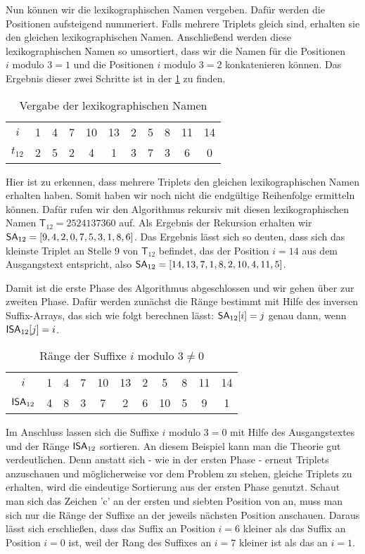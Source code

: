 Nun können wir die lexikographischen Namen vergeben. Dafür werden die Positionen aufsteigend nummeriert. Falls mehrere Triplets gleich sind, erhalten sie den gleichen lexikographischen Namen. Anschließend werden diese lexikographischen Namen so umsortiert, dass wir die Namen für die Positionen $i \text{ modulo } 3 = 1$ und die Positionen $i \text{ modulo } 3 = 2$ konkatenieren können. Das Ergebnis dieser zwei Schritte ist in der \cref{tab:lexNamen} zu finden.

\begin{table}[H]
	\centering
	\begin{tabular}{c| c c c c c c c c c c}
		$i$ & 1 & 4 & 7 & 10 & 13 & 2 & 5 & 8 & 11 & 14\\
		$t_{12}$ & 2 & 5 & 2 & 4 & 1 & 3 & 7 & 3 & 6 & 0
	\end{tabular}
	\caption{Vergabe der lexikographischen Namen}
	\label{tab:lexNamen}
\end{table}

Hier ist zu erkennen, dass mehrere Triplets den gleichen lexikographischen Namen erhalten haben. Somit haben wir noch nicht die endgültige Reihenfolge ermitteln können. Dafür rufen wir den Algorithmus rekursiv mit diesen lexikographischen Namen $\mathsf{T}_{12} = 2524137360$ auf. Als Ergebnis der Rekursion erhalten wir $\sa_{12} = [9, 4, 2, 0, 7, 5, 3, 1, 8, 6]$. Das Ergebnis lässt sich so deuten, dass sich das kleinste Triplet an Stelle 9 von $\mathsf{T}_{12}$ befindet, das der Position $i = 14$ aus dem Ausgangstext  entspricht, also $\sa_{12} = [14, 13, 7, 1, 8, 2, 10, 4, 11, 5]$. 

Damit ist die erste Phase des Algorithmus abgeschlossen und wir gehen über zur zweiten Phase. Dafür werden zunächst die Ränge bestimmt mit Hilfe des inversen Suffix-Arrays, das sich wie folgt berechnen lässt: $\sa_{12}[i] = j$ genau dann, wenn $\isa_{12}[j] = i$.

\begin{table}[H]
	\centering
	\begin{tabular}{c| c c c c c c c c c c}
		$i$ & 1 & 4 & 7 & 10 & 13 & 2 & 5 & 8 & 11 & 14 \\
		$\isa_{12}$ & 4 & 8 & 3 & 7 & 2 & 6 & 10 & 5 & 9 & 1
	\end{tabular}
	\caption{Ränge der Suffixe $i \text{ modulo } 3 \neq 0$}
	\label{tab:ergebnis_rek}
\end{table}

Im Anschluss lassen sich die Suffixe $i \text{ modulo } 3 = 0$ mit Hilfe des Aus\-gangs\-text\-es  und der Ränge $\isa_{12}$ sortieren. An diesem Beispiel kann man die Theorie gut verdeutlichen. Denn anstatt sich - wie in der ersten Phase - erneut Triplets anzuschauen und möglicherweise vor dem Problem zu stehen, gleiche Triplets zu erhalten, wird die eindeutige Sortierung aus der ersten Phase genutzt. Schaut man sich das Zeichen 'c' an der ersten und siebten Position von  an, muss man sich nur die Ränge der Suffixe an der jeweils nächsten Position anschauen. Daraus lässt sich erschließen, dass das Suffix an Position $i = 6$ kleiner als das Suffix an Position $i = 0$ ist, weil der Rang des Suffixes an $i = 7$ kleiner ist als das an $i = 1$.

